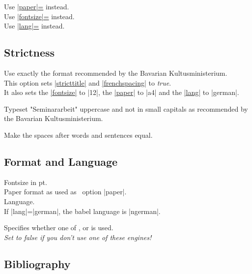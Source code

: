  Use \hyperlink{udoc.opt.paper}{|paper|=} instead. \\
 Use \hyperlink{udoc.opt.fontsize}{|fontsize|=} instead. \\
 Use \hyperlink{udoc.opt.lang}{|lang|=} instead.


\subsection{Strictness}

Use exactly the format recommended by the Bavarian Kultusministerium. \\
This option sets \hyperlink{udoc.opt.stricttitle}{|stricttitle|} and
\hyperlink{udoc.opt.frenchspacing}{|frenchspacing|} to \textit{true}. \\
It also sets the \hyperlink{udoc.opt.fontsize}{|fontsize|} to |12|, the
\hyperlink{udoc.opt.paper}{|paper|} to |a4| and the
\hyperlink{udoc.opt.lang}{|lang|} to |german|.

Typeset "Seminararbeit" uppercase and not in small capitals as recommended
by the Bavarian Kultusministerium.

Make the spaces after words and sentences equal.



\subsection{Format and Language}

Fontsize in pt. \\

Paper format as used as \report\ option |paper|. \\

Language. \\ If |lang|=|german|, the babel language is |ngerman|.

Specifies whether one of ,  or  is used. \\
\emph{Set to false if you don't use one of these engines!}



\subsection{Bibliography}

